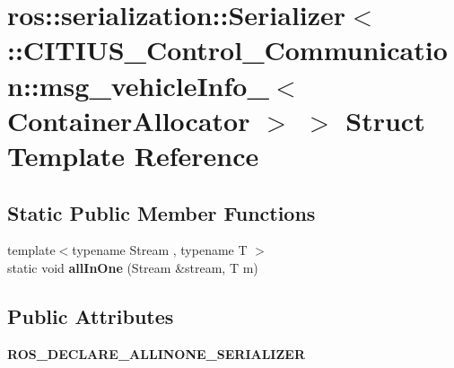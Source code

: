 \hypertarget{structros_1_1serialization_1_1_serializer_3_01_1_1_c_i_t_i_u_s___control___communication_1_1msg_e2ad5f8fe8a0f83ae0515f552ec4bd14}{\section{ros\-:\-:serialization\-:\-:\-Serializer$<$ \-:\-:\-C\-I\-T\-I\-U\-S\-\_\-\-Control\-\_\-\-Communication\-:\-:msg\-\_\-vehicle\-Info\-\_\-$<$ \-Container\-Allocator $>$ $>$ \-Struct \-Template \-Reference}
\label{structros_1_1serialization_1_1_serializer_3_01_1_1_c_i_t_i_u_s___control___communication_1_1msg_e2ad5f8fe8a0f83ae0515f552ec4bd14}
}
\subsection*{\-Static \-Public \-Member \-Functions}
\begin{DoxyCompactItemize}
\item 
\hypertarget{structros_1_1serialization_1_1_serializer_3_01_1_1_c_i_t_i_u_s___control___communication_1_1msg_e2ad5f8fe8a0f83ae0515f552ec4bd14_a49a8f10f73287ccf47eab834cc556134}{{\footnotesize template$<$typename Stream , typename T $>$ }\\static void {\bfseries all\-In\-One} (\-Stream \&stream, \-T m)}\label{structros_1_1serialization_1_1_serializer_3_01_1_1_c_i_t_i_u_s___control___communication_1_1msg_e2ad5f8fe8a0f83ae0515f552ec4bd14_a49a8f10f73287ccf47eab834cc556134}

\end{DoxyCompactItemize}
\subsection*{\-Public \-Attributes}
\begin{DoxyCompactItemize}
\item 
\hypertarget{structros_1_1serialization_1_1_serializer_3_01_1_1_c_i_t_i_u_s___control___communication_1_1msg_e2ad5f8fe8a0f83ae0515f552ec4bd14_a0cb28e8f147b4fd69d0a38ba383a5971}{{\bfseries \-R\-O\-S\-\_\-\-D\-E\-C\-L\-A\-R\-E\-\_\-\-A\-L\-L\-I\-N\-O\-N\-E\-\_\-\-S\-E\-R\-I\-A\-L\-I\-Z\-E\-R}}\label{structros_1_1serialization_1_1_serializer_3_01_1_1_c_i_t_i_u_s___control___communication_1_1msg_e2ad5f8fe8a0f83ae0515f552ec4bd14_a0cb28e8f147b4fd69d0a38ba383a5971}

\end{DoxyCompactItemize}
